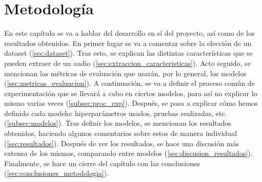 \chapter{Metodología}
\label{chap:metodologia}

En este capítulo se va a hablar del desarrollo en sí del proyecto, así como de los resultados obtenidos. En primer lugar se va a comentar sobre la elección de un dataset (\autoref{sec:dataset}). Tras esto, se explican las distintas características que se pueden extraer de un audio (\autoref{sec:extraccion_caracteristicas}). Acto seguido, se mencionan las métricas de evaluación que usarán, por lo general, los modelos (\autoref{sec:metricas_evaluacion}). A continuación, se va a definir el proceso común de experimentación que se llevará a cabo en ciertos modelos, para así no explicar lo mismo varias veces (\autoref{subsec:proc_exp}). Después, se pasa a explicar cómo hemos definido cada modelo: hiperparámetros usados, pruebas realizadas, etc. (\autoref{subsec:modelos}). Tras definir los modelos, se mencionan los resultados obtenidos, haciendo algunos comentarios sobre estos de manera individual (\autoref{sec:resultados}). Después de ver los resultados, se hace una discusión más extensa de los mismos, comparando entre modelos (\autoref{sec:discusion_resultados}). Finalmente, se hace un cierre del capítulo con las conclusiones (\autoref{sec:conclusiones_metodologia}).















